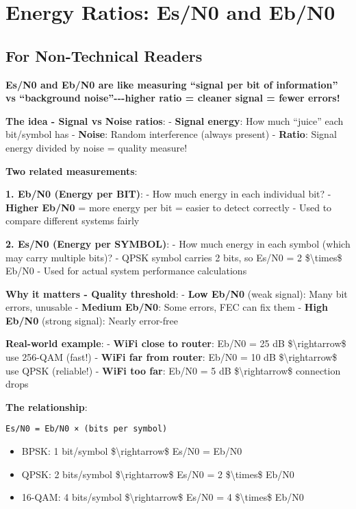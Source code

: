\section{Energy Ratios: Es/N0 and
Eb/N0}\label{energy-ratios-esn0-and-ebn0}

\subsection{\texorpdfstring{ For Non-Technical
Readers}{ For Non-Technical Readers}}\label{for-non-technical-readers}

\textbf{Es/N0 and Eb/N0 are like measuring ``signal per bit of
information'' vs ``background noise''-\/-\/-higher ratio = cleaner
signal = fewer errors!}

\textbf{The idea - Signal vs Noise ratios}: - \textbf{Signal energy}:
How much ``juice'' each bit/symbol has - \textbf{Noise}: Random
interference (always present) - \textbf{Ratio}: Signal energy divided by
noise = quality measure!

\textbf{Two related measurements}:

\textbf{1. Eb/N0 (Energy per BIT)}: - How much energy in each individual
bit? - \textbf{Higher Eb/N0} = more energy per bit = easier to detect
correctly - Used to compare different systems fairly

\textbf{2. Es/N0 (Energy per SYMBOL)}: - How much energy in each symbol
(which may carry multiple bits)? - QPSK symbol carries 2 bits, so Es/N0
= 2 \$\textbackslash times\$ Eb/N0 - Used for actual system performance
calculations

\textbf{Why it matters - Quality threshold}: - \textbf{Low Eb/N0} (weak
signal): Many bit errors, unusable - \textbf{Medium Eb/N0}: Some errors,
FEC can fix them - \textbf{High Eb/N0} (strong signal): Nearly
error-free

\textbf{Real-world example}: - \textbf{WiFi close to router}: Eb/N0 = 25
dB \$\textbackslash rightarrow\$ use 256-QAM (fast!) - \textbf{WiFi far
from router}: Eb/N0 = 10 dB \$\textbackslash rightarrow\$ use QPSK
(reliable!) - \textbf{WiFi too far}: Eb/N0 = 5 dB
\$\textbackslash rightarrow\$ connection drops

\textbf{The relationship}:

\begin{verbatim}
Es/N0 = Eb/N0 × (bits per symbol)
\end{verbatim}

\begin{itemize}
\tightlist
\item
  BPSK: 1 bit/symbol \$\textbackslash rightarrow\$ Es/N0 = Eb/N0
\item
  QPSK: 2 bits/symbol \$\textbackslash rightarrow\$ Es/N0 = 2
  \$\textbackslash times\$ Eb/N0
\item
  16-QAM: 4 bits/symbol \$\textbackslash rightarrow\$ Es/N0 = 4
  \$\textbackslash times\$ Eb/N0
\end{itemize}

